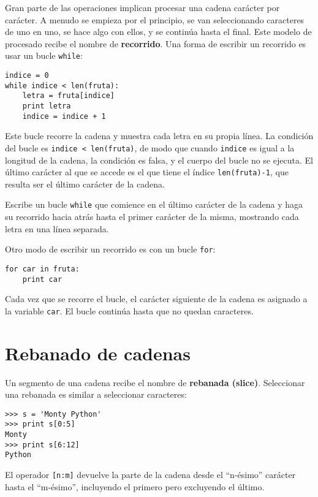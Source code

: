 Gran parte de las operaciones implican procesar una cadena carácter por
carácter. A menudo se empieza por el principio, se van seleccionando caracteres
de uno en uno, se hace algo con ellos, y se continúa hasta el final. Este modelo
de procesado recibe el nombre de {\bf recorrido}. Una forma de escribir un recorrido
es usar un bucle {\tt while}:

\beforeverb
\begin{verbatim}
indice = 0
while indice < len(fruta):
    letra = fruta[indice]
    print letra
    indice = indice + 1
\end{verbatim}
\afterverb
%
Este bucle recorre la cadena y muestra cada letra en su propia línea.
La condición del bucle es {\tt indice < len(fruta)}, de modo
que cuando {\tt indice} es igual a la longitud de la cadena, la
condición es falsa, y el cuerpo del bucle no se ejecuta. El
último carácter al que se accede es el que tiene el índice {\tt len(fruta)-1},
que resulta ser el último carácter de la cadena.

\begin{ex}
Escribe un bucle {\tt while} que comience en el último carácter de la cadena
y haga su recorrido hacia atrás hasta el primer carácter de la misma,
mostrando cada letra en una línea separada.
\end{ex}

Otro modo de escribir un recorrido es con un bucle {\tt for}:

\beforeverb
\begin{verbatim}
for car in fruta:
    print car
\end{verbatim}
\afterverb
%
Cada vez que se recorre el bucle, el carácter siguiente de la cadena es asignado
a la variable {\tt car}. El bucle continúa hasta que no quedan caracteres.


\section{Rebanado de cadenas}
\label{slice}


Un segmento de una cadena recibe el nombre de {\bf rebanada (slice)}.
Seleccionar una rebanada es similar a seleccionar caracteres:

\beforeverb
\begin{verbatim}
>>> s = 'Monty Python'
>>> print s[0:5]
Monty
>>> print s[6:12]
Python
\end{verbatim}
\afterverb
%
El operador {\tt [n:m]} devuelve la parte de la cadena desde el
``n-ésimo'' carácter hasta el ``m-ésimo'', incluyendo el primero
pero excluyendo el último.

